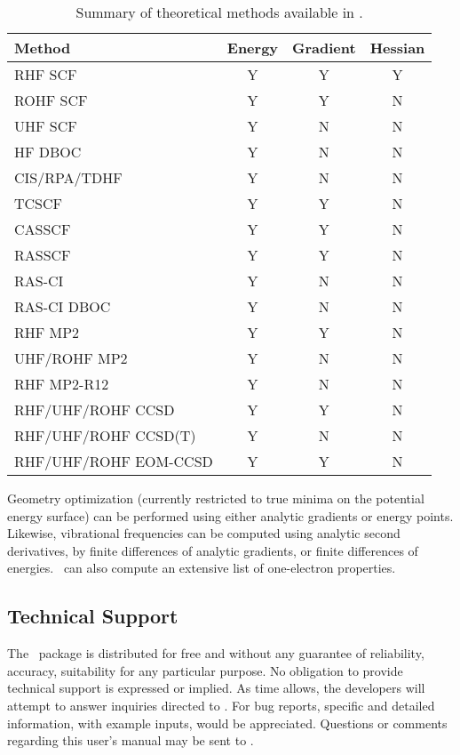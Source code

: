 \begin{table}
\caption{Summary of theoretical methods available in \PSIthree.} \label{table:methods}
\parsep 10pt
\begin{center}
\begin{tabular}{lccc} \hline\hline
Method                & Energy & Gradient & Hessian \\ \hline
RHF SCF               & Y & Y & Y \\
ROHF SCF              & Y & Y & N \\
UHF SCF               & Y & N & N \\
HF DBOC               & Y & N & N \\
CIS/RPA/TDHF          & Y & N & N \\
TCSCF                 & Y & Y & N \\
CASSCF                & Y & Y & N \\
RASSCF                & Y & Y & N \\
RAS-CI                & Y & N & N \\
RAS-CI DBOC           & Y & N & N \\
RHF MP2               & Y & Y & N \\
UHF/ROHF MP2          & Y & N & N \\
RHF MP2-R12           & Y & N & N \\
RHF/UHF/ROHF CCSD     & Y & Y & N \\
RHF/UHF/ROHF CCSD(T)  & Y & N & N \\
RHF/UHF/ROHF EOM-CCSD & Y & Y & N \\
\hline\hline
\end{tabular}
\end{center}
\end{table}
Geometry optimization (currently restricted to true minima on the potential
energy surface) can be performed using either analytic gradients
or energy points.  Likewise, vibrational frequencies can be 
computed using analytic second derivatives, by finite
differences of analytic gradients, or finite differences of energies.
\PSIthree\ can also compute an extensive list of one-electron properties.

\subsection{Technical Support} The \PSIthree\ package is
distributed for free and without any guarantee of reliability,
accuracy, suitability for any particular purpose.  No obligation
to provide technical support is expressed or implied.  As time
allows, the developers will attempt to answer inquiries directed to
.
For bug reports, specific and detailed information, with example
inputs, would be appreciated.  Questions or comments regarding
this user's manual may be sent to .



